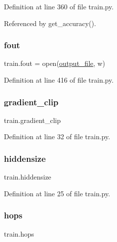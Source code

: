 Definition at line 360 of file train.\+py.



Referenced by get\+\_\+accuracy().

\mbox{\label{namespacetrain_a824aa8f7a68ad5e626aed978e756e005}} 
\subsubsection{\texorpdfstring{fout}{fout}}
{\footnotesize\ttfamily train.\+fout = open(\hyperlink{namespacetrain_aeaa702306f07912976fe68c59b1a1bcd}{output\+\_\+file}, \textquotesingle{}w\textquotesingle{})}



Definition at line 416 of file train.\+py.

\mbox{\label{namespacetrain_ab8abdbc8c407226fd20791e2713ed052}} 
\subsubsection{\texorpdfstring{gradient\+\_\+clip}{gradient\_clip}}
{\footnotesize\ttfamily train.\+gradient\+\_\+clip}



Definition at line 32 of file train.\+py.

\mbox{\label{namespacetrain_a32f0e3dc85526e2620466372fe24fec5}} 
\subsubsection{\texorpdfstring{hiddensize}{hiddensize}}
{\footnotesize\ttfamily train.\+hiddensize}



Definition at line 25 of file train.\+py.

\mbox{\label{namespacetrain_a6778555638afb2529f4818fda80d9fd6}} 
\subsubsection{\texorpdfstring{hops}{hops}}
{\footnotesize\ttfamily train.\+hops}



